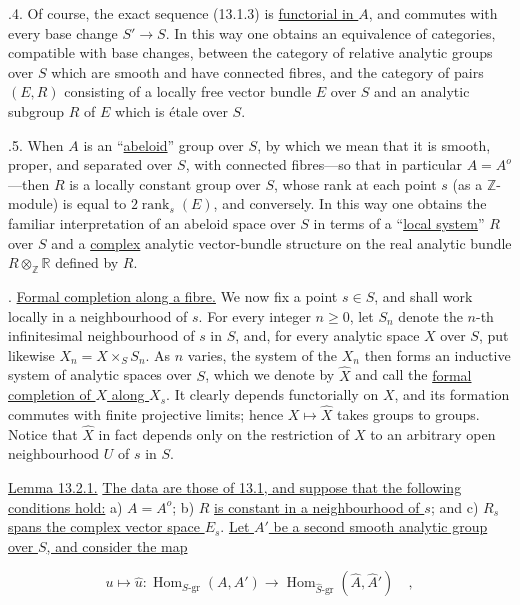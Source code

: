 \medskip
{}.4. Of course, the exact sequence (13.1.3) is
\underline{functorial in $A$}, and commutes with every base change
$S'\longrightarrow S$. In this way one obtains an equivalence of
categories, compatible with base changes, between the category of
relative analytic groups over $S$ which are smooth and have connected
fibres, and the category of pairs $(E,R)$ consisting of a locally free
vector bundle $E$ over $S$ and an analytic subgroup $R$ of $E$ which is
\'etale over $S$.

\medskip
{}.5. When $A$ is an ``\underline{abeloid}'' group over $S$, by which
we mean that it is smooth, proper, and separated over $S$, with connected
fibres---so that in particular $A=A^o$---then $R$ is a locally constant
group over $S$, whose rank at each point $s$ (as a $\mathbb Z$-module) is
equal to $2\operatorname{rank}_s(E)$, and conversely. In this way one
obtains the familiar interpretation of an abeloid space over $S$ in
terms of a ``\underline{local system}'' $R$ over $S$ and a
\underline{complex} analytic vector-bundle structure on the real
analytic bundle $R\otimes_{\mathbb Z}\mathbb R$ defined by $R$.

\medskip
{}. \underline{Formal completion along a fibre.} We now fix a point
$s\in S$, and shall work locally in a neighbourhood of $s$. For every
integer $n\geqslant0$, let $S_n$ denote the $n$-th infinitesimal
neighbourhood of $s$ in $S$, and, for every analytic space $X$ over $S$,
put likewise $X_n=X\times_S S_n$. As $n$ varies, the system of the $X_n$
then forms an inductive system of analytic spaces over $S$, which we
denote by $\widehat X$ and call the \underline{formal completion of $X$
along $X_s$}. It clearly depends functorially on $X$, and its formation
commutes with finite projective limits; hence $X\longmapsto\widehat X$
takes groups to groups. Notice that $\widehat X$ in fact depends only on
the restriction of $X$ to an arbitrary open neighbourhood $U$ of $s$ in
$S$.

\medskip
\noindent
\underline{Lemma 13.2.1.} \underline{The data are those of 13.1, and
suppose that the following conditions hold:} a) $A=A^o$;
b) $R$ \underline{is constant in a neighbourhood of $s$}; and
c) $R_s$ \underline{spans the complex vector space $E_s$}.
\underline{Let $A'$ be a second smooth analytic group over $S$, and
consider the map}

\begin{equation*}
 u\longmapsto\widehat u:
 \operatorname{Hom}_{S\text{-}\mathrm{gr}}(A,A')
 \longrightarrow
 \operatorname{Hom}_{\widehat S\text{-}\mathrm{gr}}
   (\widehat A,\widehat {A}')\quad ,
\end{equation*}

